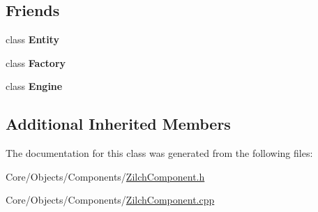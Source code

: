 \subsection*{Friends}
\begin{DoxyCompactItemize}
\item 
\hypertarget{classDCEngine_1_1ZilchComponent_a614439ccac0344926adc4c0165d64060}{class {\bfseries Entity}}\label{classDCEngine_1_1ZilchComponent_a614439ccac0344926adc4c0165d64060}

\item 
\hypertarget{classDCEngine_1_1ZilchComponent_a328c093d609680cca505905c6d49901a}{class {\bfseries Factory}}\label{classDCEngine_1_1ZilchComponent_a328c093d609680cca505905c6d49901a}

\item 
\hypertarget{classDCEngine_1_1ZilchComponent_a3e1914489e4bed4f9f23cdeab34a43dc}{class {\bfseries Engine}}\label{classDCEngine_1_1ZilchComponent_a3e1914489e4bed4f9f23cdeab34a43dc}

\end{DoxyCompactItemize}
\subsection*{Additional Inherited Members}


The documentation for this class was generated from the following files\-:\begin{DoxyCompactItemize}
\item 
Core/\-Objects/\-Components/\hyperlink{ZilchComponent_8h}{Zilch\-Component.\-h}\item 
Core/\-Objects/\-Components/\hyperlink{ZilchComponent_8cpp}{Zilch\-Component.\-cpp}\end{DoxyCompactItemize}
